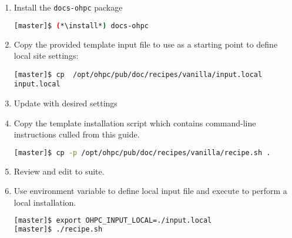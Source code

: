 \begin{enumerate}
\item Install the \texttt{docs-ohpc} package

\begin{lstlisting}[language=bash,keywords={}]
[master]$ (*\install*) docs-ohpc
\end{lstlisting}

\item Copy the provided template input file to use as a starting point to
  define local site settings:
\begin{lstlisting}
[master]$ cp  /opt/ohpc/pub/doc/recipes/vanilla/input.local input.local
\end{lstlisting}

\item Update  with desired settings

\item Copy the template installation script which contains command-line
  instructions culled from this guide.

\begin{lstlisting}[language=bash,keywords={}]
[master]$ cp -p /opt/ohpc/pub/doc/recipes/vanilla/recipe.sh .
\end{lstlisting}

\item Review and edit  to suite.

\item Use environment variable to define local input file and execute
   to perform a local installation.

\begin{lstlisting}[language=bash,keywords={}]
[master]$ export OHPC_INPUT_LOCAL=./input.local
[master]$ ./recipe.sh
\end{lstlisting}
\end{enumerate}



